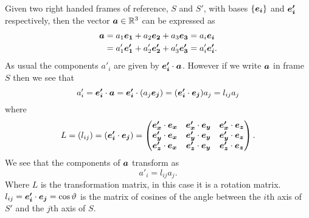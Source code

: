 Given two right handed frames of reference, \(S\) and \(S'\), with bases \(\{\bm{e_{i}}\}\) and \(\bm{e'_i}\) respectively, then the vector \(\bm{a}\in\mathbb{R}^3\) can be expressed as
\begin{align*}
    \bm{a} &= a_1\bm{e_{1}} + a_2\bm{e_{2}} + a_3\bm{e_{3}} = a_i\bm{e_{i}}\\
    &= a'_1\bm{e'_1} + a'_2\bm{e'_2} + a'_3\bm{e'_3} = a'_i\bm{e'_i}.
\end{align*}
As usual the components \(a'_i\) are given by \(\bm{e'_i}\cdot\bm{a}\).
However if we write \(\bm{a}\) in frame \(S\) then we see that
\[a'_i = \bm{e'_i}\cdot\bm{a} = \bm{e'_i}\cdot(a_j\bm{e_{j}}) = (\bm{e'_i}\cdot\bm{e_{j}})a_j = l_{ij}a_j\]
where
\[
L = (l_{ij}) = (\bm{e'_i}\cdot\bm{e_{j}}) =
\begin{pmatrix}
    \bm{e'_x}\cdot\bm{e_{x}} & \bm{e'_x}\cdot\bm{e_{y}} & \bm{e'_x}\cdot\bm{e_{z}}\\
    \bm{e'_y}\cdot\bm{e_{x}} & \bm{e'_y}\cdot\bm{e_{y}} & \bm{e'_y}\cdot\bm{e_{z}}\\
    \bm{e'_z}\cdot\bm{e_{x}} & \bm{e'_z}\cdot\bm{e_{y}} & \bm{e'_z}\cdot\bm{e_{z}}
\end{pmatrix}
.
\]
We see that the components of \(\bm{a}\) transform as
\[a'_i = l_{ij}a_j.\]
Where \(L\) is the transformation matrix, in this case it is a rotation matrix.
\(l_{ij} = \bm{e'_i}\cdot\bm{e_{j}} = \cos\vartheta\) is the matrix of cosines of the angle between the \(i\)th axis of \(S'\) and the \(j\)th axis of \(S\).

